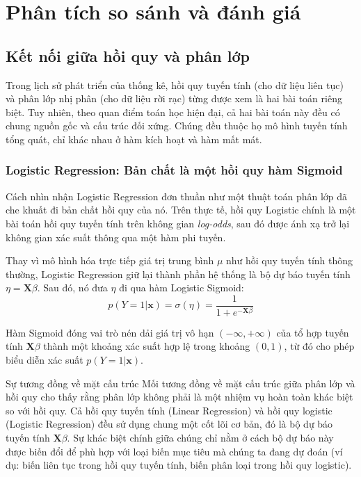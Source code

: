 \section{Phân tích so sánh và đánh giá}

\subsection{Kết nối giữa hồi quy và phân lớp}

Trong lịch sử phát triển của thống kê, hồi quy tuyến tính (cho dữ liệu liên tục) và phân lớp nhị phân (cho dữ liệu rời rạc) từng được xem là hai bài toán riêng biệt. Tuy nhiên, theo quan điểm toán học hiện đại, cả hai bài toán này đều có chung nguồn gốc và cấu trúc đối xứng. Chúng đều thuộc họ mô hình tuyến tính tổng quát, chỉ khác nhau ở hàm kích hoạt và hàm mất mát.

\subsubsection{Logistic Regression: Bản chất là một hồi quy hàm Sigmoid}

Cách nhìn nhận Logistic Regression đơn thuần như một thuật toán phân lớp đã che khuất đi bản chất hồi quy của nó. Trên thực tế, hồi quy Logistic chính là một bài toán hồi quy tuyến tính trên không gian \textit{log-odds}, sau đó được ánh xạ trở lại không gian xác suất thông qua một hàm phi tuyến.

Thay vì mô hình hóa trực tiếp giá trị trung bình $\mu$ như hồi quy tuyến tính thông thường, Logistic Regression giữ lại thành phần hệ thống là bộ dự báo tuyến tính $\eta = \mathbf{X}\beta$. Sau đó, nó đưa $\eta$ đi qua hàm Logistic Sigmoid:
\begin{equation}
    p(Y=1 | \mathbf{x}) = \sigma(\eta) = \frac{1}{1 + e^{-\mathbf{X}\beta}}
\end{equation}

Hàm Sigmoid đóng vai trò nén dải giá trị vô hạn $(-\infty, +\infty)$ của tổ hợp tuyến tính $\mathbf{X}\beta$ thành một khoảng xác suất hợp lệ trong khoảng $(0, 1)$, từ đó cho phép biểu diễn xác suất $p(Y=1 | \mathbf{x})$.

\begin{notebox}{Sự tương đồng về mặt cấu trúc}
Mối tương đồng về mặt cấu trúc giữa phân lớp và hồi quy cho thấy rằng phân lớp không phải là một nhiệm vụ hoàn toàn khác biệt so với hồi quy. Cả hồi quy tuyến tính (Linear Regression) và hồi quy logistic (Logistic Regression) đều sử dụng chung một cốt lõi cơ bản, đó là bộ dự báo tuyến tính $\mathbf{X}\beta$. Sự khác biệt chính giữa chúng chỉ nằm ở cách bộ dự báo này được biến đổi để phù hợp với loại biến mục tiêu mà chúng ta đang dự đoán (ví dụ: biến liên tục trong hồi quy tuyến tính, biến phân loại trong hồi quy logistic).
\end{notebox}

